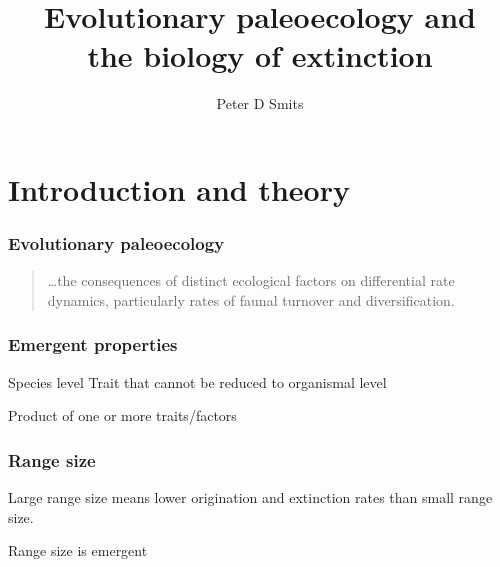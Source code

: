 \documentclass{beamer}
\title{Evolutionary paleoecology and\\ the biology of extinction}
\author{Peter D Smits}
\institute{Committee on Evolutionary Biology, University of Chicago}
\begin{document}
\begin{frame}
  \maketitle
\end{frame}

\begin{frame}
  \tableofcontents
\end{frame}


\section{Introduction and theory}

\begin{frame}
  \frametitle{Evolutionary paleoecology}
  \begin{quotation}
    \dots the consequences of distinct ecological factors on differential rate dynamics, particularly rates of faunal turnover and diversification.

  \end{quotation}

\end{frame}

\begin{frame}
  \frametitle{Emergent properties}

  \begin{block}{Species level}
    Trait that cannot be reduced to organismal level
    
    Product of one or more traits/factors
  \end{block}

\end{frame}

\begin{frame}
  \frametitle{Range size}
  Large range size means lower origination and extinction rates than small range size.

  Range size is emergent

\end{frame}
\end{document}

